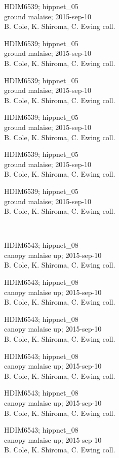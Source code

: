 \documentclass[2pt]{extarticle}
\begin{document}
\noindent
\parbox{0.16\textwidth}{\tiny \raggedright \rule[-0.3\baselineskip]{0pt}{10pt}HDIM6539; hippnet\_05\\ ground malaise; 2015-sep-10\\ B. Cole, K. Shiroma, C. Ewing coll.}
\parbox{0.16\textwidth}{\tiny \raggedright \rule[-0.3\baselineskip]{0pt}{10pt}HDIM6539; hippnet\_05\\ ground malaise; 2015-sep-10\\ B. Cole, K. Shiroma, C. Ewing coll.}
\parbox{0.16\textwidth}{\tiny \raggedright \rule[-0.3\baselineskip]{0pt}{10pt}HDIM6539; hippnet\_05\\ ground malaise; 2015-sep-10\\ B. Cole, K. Shiroma, C. Ewing coll.}
\parbox{0.16\textwidth}{\tiny \raggedright \rule[-0.3\baselineskip]{0pt}{10pt}HDIM6539; hippnet\_05\\ ground malaise; 2015-sep-10\\ B. Cole, K. Shiroma, C. Ewing coll.}
\parbox{0.16\textwidth}{\tiny \raggedright \rule[-0.3\baselineskip]{0pt}{10pt}HDIM6539; hippnet\_05\\ ground malaise; 2015-sep-10\\ B. Cole, K. Shiroma, C. Ewing coll.}
\parbox{0.16\textwidth}{\tiny \raggedright \rule[-0.3\baselineskip]{0pt}{10pt}HDIM6539; hippnet\_05\\ ground malaise; 2015-sep-10\\ B. Cole, K. Shiroma, C. Ewing coll.} \\ 
\vspace{0.001in} 

\noindent
\parbox{0.16\textwidth}{\tiny \raggedright \rule[-0.3\baselineskip]{0pt}{10pt}HDIM6543; hippnet\_08\\ canopy malaise up; 2015-sep-10\\ B. Cole, K. Shiroma, C. Ewing coll.}
\parbox{0.16\textwidth}{\tiny \raggedright \rule[-0.3\baselineskip]{0pt}{10pt}HDIM6543; hippnet\_08\\ canopy malaise up; 2015-sep-10\\ B. Cole, K. Shiroma, C. Ewing coll.}
\parbox{0.16\textwidth}{\tiny \raggedright \rule[-0.3\baselineskip]{0pt}{10pt}HDIM6543; hippnet\_08\\ canopy malaise up; 2015-sep-10\\ B. Cole, K. Shiroma, C. Ewing coll.}
\parbox{0.16\textwidth}{\tiny \raggedright \rule[-0.3\baselineskip]{0pt}{10pt}HDIM6543; hippnet\_08\\ canopy malaise up; 2015-sep-10\\ B. Cole, K. Shiroma, C. Ewing coll.}
\parbox{0.16\textwidth}{\tiny \raggedright \rule[-0.3\baselineskip]{0pt}{10pt}HDIM6543; hippnet\_08\\ canopy malaise up; 2015-sep-10\\ B. Cole, K. Shiroma, C. Ewing coll.}
\parbox{0.16\textwidth}{\tiny \raggedright \rule[-0.3\baselineskip]{0pt}{10pt}HDIM6543; hippnet\_08\\ canopy malaise up; 2015-sep-10\\ B. Cole, K. Shiroma, C. Ewing coll.} \\ 
\vspace{0.001in} 
\end{document}
